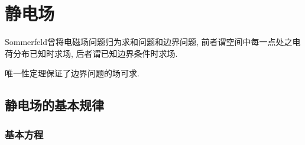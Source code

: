 \documentclass[hidelinks]{ctexart}
\begin{document}
\section{静电场} %
\label{sec:静电场}

Sommerfeld曾将电磁场问题归为求和问题和边界问题, 前者谓空间中每一点处之电荷分布已知时求场, 后者谓已知边界条件时求场.
\par
唯一性定理保证了边界问题的场可求.

\subsection{静电场的基本规律} %
\label{sub:静电场的基本规律}

\subsubsection{基本方程} %
\label{ssub:基本方程}
\end{document}
